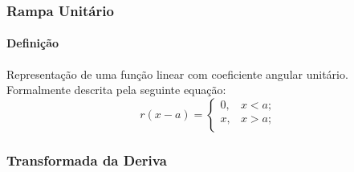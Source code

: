 \documentclass{article}
\begin{document}
            \subsubsection{Rampa Unitário}
                \paragraph{Definição}Representação de uma função linear com coeficiente angular unitário. Formalmente descrita pela seguinte equação:
                    \begin{equation}
                        \boxed{
                            r(x - a) = 
                            \begin{cases}
                                0, & x < a;\\
                                x, & x > a;\\
                            \end{cases}
                        }
                    \end{equation}

            \subsubsection{Transformada da Deriva}
\end{document}

